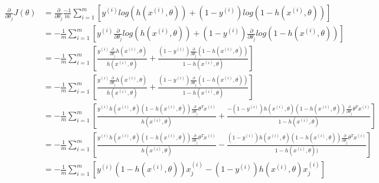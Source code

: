 \documentclass[12pt]{article}
\begin{document}
\begin{align*}\frac{\partial}{\partial \theta_j} J(\theta) &= \frac{\partial}{\partial \theta_j} \frac{-1}{m}\sum_{i=1}^m \left [ y^{(i)} log ( h(x^{(i)}, \theta) ) + (1-y^{(i)}) log (1 -  h(x^{(i)}, \theta)) \right ] \\ &= - \frac{1}{m}\sum_{i=1}^m \left [     y^{(i)} \frac{\partial}{\partial \theta_j} log ( h(x^{(i)}, \theta))   + (1-y^{(i)}) \frac{\partial}{\partial                                                                                  \theta_j} log (1 -  h(x^{(i)}, \theta))\right ] \\
                                                           &= - \frac{1}{m}\sum_{i=1}^m \left [     \frac{y^{(i)} \frac{\partial}{\partial \theta_j}  h(x^{(i)}, \theta)}{ h(x^{(i)}, \theta)}   + \frac{(1-y^{(i)})\frac{\partial}{\partial                                                      \theta_j} (1 -  h(x^{(i)}, \theta))}{1 -  h(x^{(i)}, \theta)}\right ] \\
                                                           &= - \frac{1}{m}\sum_{i=1}^m \left [     \frac{y^{(i)} \frac{\partial}{\partial \theta_j}  h(x^{(i)}, \theta)}{ h(x^{(i)}, \theta)}   + \frac{(1-y^{(i)})\frac{\partial}{\partial \theta_j} (1 -  h(x^{(i)}, \theta))}{1                                                              -  h(x^{(i)}, \theta)}\right ] \\
                                                           &= - \frac{1}{m}\sum_{i=1}^m \left [     \frac{y^{(i)}  h(x^{(i)}, \theta) (1 -  h(x^{(i)}, \theta)) \frac{\partial}{\partial \theta_j} \theta^T x^{(i)}}{ h(x^{(i)}, \theta)}   + \frac{- (1-y^{(i)})  h(x^{(i)}, \theta)(1 -  h(x^{(i)}, \theta)) \frac{\partial}{\partial \theta_j} \theta^T x^{(i)}}{1 -  h(x^{(i)},                                                              \theta)}\right ] \\
                                                           &= - \frac{1}{m}\sum_{i=1}^m \left [     \frac{y^{(i)}  h(x^{(i)}, \theta) (1 -  h(x^{(i)}, \theta)) \frac{\partial}{\partial \theta_j} \theta^T x^{(i)}}{ h(x^{(i)}, \theta)}   - \frac{(1-y^{(i)}) h(x^{(i)}, \theta) (1 -  h(x^{(i)}, \theta)) \frac{\partial}{\partial \theta_j} \theta^T x^{(i)}}{1 -  h(x^{(i)},                                                              \theta))}\right ] \\
                                                           &= - \frac{1}{m}\sum_{i=1}^m \left [     y^{(i)} (1 -  h(x^{(i)}, \theta)) x^{(i)}_j                                                              - (1-y^{(i)})  h(x^{(i)}, \theta) x^{(i)}_j\right ] \\

\end{align*}
\end{document}
